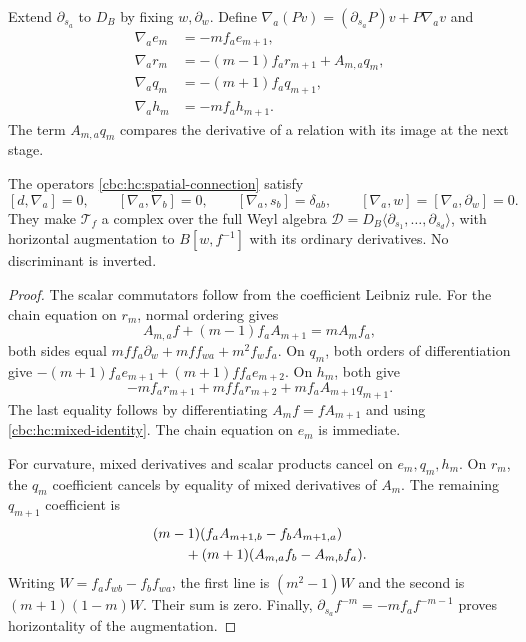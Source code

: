 Extend $\partial_{s_a}$ to $D_B$ by fixing $w,\partial_w$.
Define $\nabla_a(Pv)=(\partial_{s_a}P)v+P\nabla_av$ and
\begin{equation}\label{cbc:hc:spatial-connection}
 \begin{aligned}
 \nabla_ae_m&=-mf_ae_{m+1},\\
 \nabla_ar_m&=-(m-1)f_ar_{m+1}+A_{m,a}q_m,\\
 \nabla_aq_m&=-(m+1)f_aq_{m+1},\\
 \nabla_ah_m&=-mf_ah_{m+1}.
 \end{aligned}
\end{equation}
The term $A_{m,a}q_m$ compares the derivative of a relation
with its image at the next stage.

\begin{theorem}\label{cbc:hc:spatial-flatness}
The operators \eqref{cbc:hc:spatial-connection} satisfy
\[
 [d,\nabla_a]=0,\qquad [\nabla_a,\nabla_b]=0,\qquad
 [\nabla_a,s_b]=\delta_{ab},\qquad
 [\nabla_a,w]=[\nabla_a,\partial_w]=0.
\]
They make $\mathcal T_f$ a complex over the full Weyl algebra
$\mathscr D=D_B\langle\partial_{s_1},\ldots,\partial_{s_d}\rangle$,
with horizontal augmentation to $B[w,f^{-1}]$ with its
ordinary derivatives. No discriminant is inverted.
\end{theorem}

\begin{proof}
The scalar commutators follow from the coefficient Leibniz
rule. For the chain equation on $r_m$, normal ordering gives
\begin{equation}\label{cbc:hc:mixed-identity}
 A_{m,a}f+(m-1)f_aA_{m+1}=mA_mf_a,
\end{equation}
both sides equal
$mff_a\partial_w+mff_{wa}+m^2f_wf_a$.
On $q_m$, both orders of differentiation give
$-(m+1)f_ae_{m+1}+(m+1)ff_ae_{m+2}$.
On $h_m$, both give
\[
 -mf_ar_{m+1}+mff_ar_{m+2}+mf_aA_{m+1}q_{m+1}.
\]
The last equality follows by differentiating
$A_mf=fA_{m+1}$ and using \eqref{cbc:hc:mixed-identity}.
The chain equation on $e_m$ is immediate.

For curvature, mixed derivatives and scalar products cancel
on $e_m,q_m,h_m$. On $r_m$, the $q_m$ coefficient cancels
by equality of mixed derivatives of $A_m$. The remaining
$q_{m+1}$ coefficient is
\begin{align*}
 &(m-1)(f_aA_{m+1,b}-f_bA_{m+1,a})\\
 &\hspace{8mm}+(m+1)(A_{m,a}f_b-A_{m,b}f_a).
\end{align*}
Writing $W=f_af_{wb}-f_bf_{wa}$, the first line is
$(m^2-1)W$ and the second is $(m+1)(1-m)W$.
Their sum is zero. Finally,
$\partial_{s_a}f^{-m}=-mf_af^{-m-1}$ proves horizontality
of the augmentation.
\end{proof}


